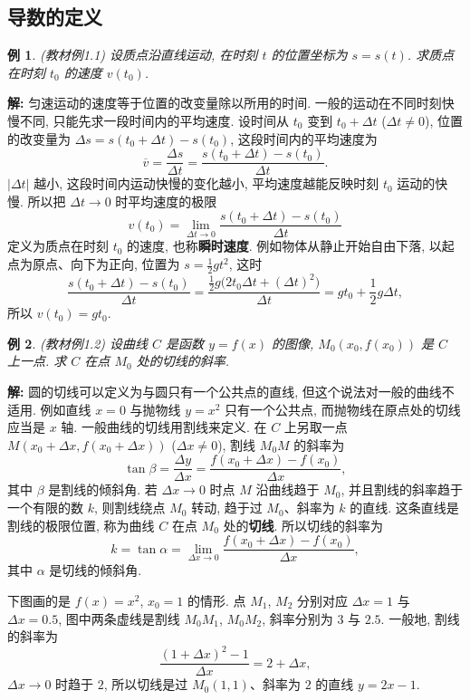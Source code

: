 \documentclass[UTF8,openany]{ctexbook}
\theoremstyle{chinesetextbook}
\newtheorem{example}{例}[section]
\newenvironment{cnsolution}{\par\indent\textbf{解:} \ignorespaces}{\par}
\begin{document}
\subsection{导数的定义}
\begin{example}\label{ex:c2-1-1}
\textnormal{(教材例1.1)} 设质点沿直线运动, 在时刻 $t$ 的位置坐标为 $s=s(t)$. 求质点在时刻 $t_0$ 的速度 $v(t_0)$.
\end{example}
\begin{cnsolution}
匀速运动的速度等于位置的改变量除以所用的时间. 一般的运动在不同时刻快慢不同, 只能先求一段时间内的平均速度. 设时间从 $t_0$ 变到 $t_0+\Delta t$ ($\Delta t\ne0$), 位置的改变量为 $\Delta s=s(t_0+\Delta t)-s(t_0)$, 这段时间内的平均速度为
\[
\overline v=\frac{\Delta s}{\Delta t}=\frac{s(t_0+\Delta t)-s(t_0)}{\Delta t}.
\]
$|\Delta t|$ 越小, 这段时间内运动快慢的变化越小, 平均速度越能反映时刻 $t_0$ 运动的快慢. 所以把 $\Delta t\to0$ 时平均速度的极限
\[
v(t_0)=\lim_{\Delta t\to0}\frac{s(t_0+\Delta t)-s(t_0)}{\Delta t}
\]
定义为质点在时刻 $t_0$ 的速度, 也称\textbf{瞬时速度}. 例如物体从静止开始自由下落, 以起点为原点、向下为正向, 位置为 $\displaystyle s=\frac12gt^2$, 这时
\[
\frac{s(t_0+\Delta t)-s(t_0)}{\Delta t}=\frac{\frac12g\bigl(2t_0\Delta t+(\Delta t)^2\bigr)}{\Delta t}=gt_0+\frac12g\Delta t,
\]
所以 $v(t_0)=gt_0$.
\end{cnsolution}
\begin{example}\label{ex:c2-1-2}
\textnormal{(教材例1.2)} 设曲线 $C$ 是函数 $y=f(x)$ 的图像, $M_0(x_0,f(x_0))$ 是 $C$ 上一点. 求 $C$ 在点 $M_0$ 处的切线的斜率.
\end{example}
\begin{cnsolution}
圆的切线可以定义为与圆只有一个公共点的直线, 但这个说法对一般的曲线不适用. 例如直线 $x=0$ 与抛物线 $y=x^2$ 只有一个公共点, 而抛物线在原点处的切线应当是 $x$ 轴. 一般曲线的切线用割线来定义. 在 $C$ 上另取一点 $M(x_0+\Delta x,f(x_0+\Delta x))$ ($\Delta x\ne0$), 割线 $M_0M$ 的斜率为
\[
\tan\beta=\frac{\Delta y}{\Delta x}=\frac{f(x_0+\Delta x)-f(x_0)}{\Delta x},
\]
其中 $\beta$ 是割线的倾斜角. 若 $\Delta x\to0$ 时点 $M$ 沿曲线趋于 $M_0$, 并且割线的斜率趋于一个有限的数 $k$, 则割线绕点 $M_0$ 转动, 趋于过 $M_0$、斜率为 $k$ 的直线. 这条直线是割线的极限位置, 称为曲线 $C$ 在点 $M_0$ 处的\textbf{切线}. 所以切线的斜率为
\[
k=\tan\alpha=\lim_{\Delta x\to0}\frac{f(x_0+\Delta x)-f(x_0)}{\Delta x},
\]
其中 $\alpha$ 是切线的倾斜角.

下图画的是 $f(x)=x^2$, $x_0=1$ 的情形. 点 $M_1$, $M_2$ 分别对应 $\Delta x=1$ 与 $\Delta x=0.5$, 图中两条虚线是割线 $M_0M_1$, $M_0M_2$, 斜率分别为 $3$ 与 $2.5$. 一般地, 割线的斜率为
\[
\frac{(1+\Delta x)^2-1}{\Delta x}=2+\Delta x,
\]
$\Delta x\to0$ 时趋于 $2$, 所以切线是过 $M_0(1,1)$、斜率为 $2$ 的直线 $y=2x-1$.
\end{cnsolution}
\end{document}
